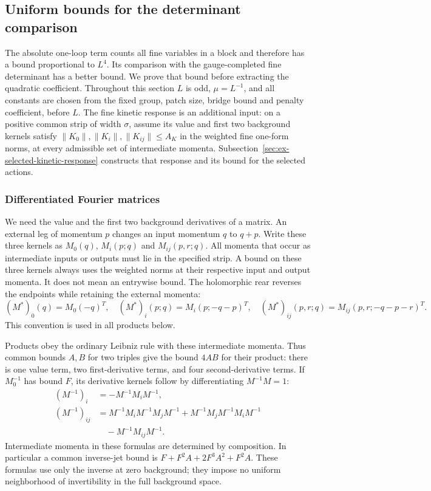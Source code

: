 \subsection{Uniform bounds for the determinant comparison}
\label{sec:ex-stationary-determinant-prices}

The absolute one-loop term counts all fine variables in a block and
therefore has a bound proportional to $L^4$. Its comparison with the
gauge-completed fine determinant has a better bound. We prove that
bound before extracting the quadratic coefficient. Throughout this
section $L$ is odd, $\mu=L^{-1}$, and all constants are chosen from
the fixed group, patch size, bridge bound and penalty coefficient,
before $L$. The fine kinetic response is an additional input: on a positive
common strip of width $\sigma$, assume its value and first two
background kernels satisfy $\|K_0\|,\|K_i\|,\|K_{ij}\|\leq A_K$
in the weighted fine one-form norms, at every admissible set of
intermediate momenta. Subsection~\ref{sec:ex-selected-kinetic-response}
constructs that response and its bound for the selected actions.

\subsubsection{Differentiated Fourier matrices}
We need the value and the first two background derivatives of a matrix.
An external leg of momentum $p$ changes an input momentum $q$ to $q+p$.
Write these three kernels as $M_0(q)$, $M_i(p;q)$ and
$M_{ij}(p,r;q)$. All momenta that occur as intermediate inputs or
outputs must lie in the specified strip. A bound on these three
kernels always uses the weighted norms at their respective input and
output momenta. It does not mean an entrywise bound. The holomorphic rear reverses
the endpoints while retaining the external momenta:
\[
 (M^*)_0(q)=M_0(-q)^T,\quad
 (M^*)_i(p;q)=M_i(p;-q-p)^T,\quad
 (M^*)_{ij}(p,r;q)=M_{ij}(p,r;-q-p-r)^T.
\]
This convention is used in all products below.

Products obey the ordinary Leibniz rule with these intermediate momenta.
Thus common bounds $A,B$ for two triples give the bound $4AB$ for
their product: there is one value term, two first-derivative terms,
and four second-derivative terms. If $M_0^{-1}$ has bound $F$, its
derivative kernels follow by differentiating $M^{-1}M=1$:
\begin{align*}
 (M^{-1})_i&=-M^{-1}M_iM^{-1},\\
 (M^{-1})_{ij}&=M^{-1}M_iM^{-1}M_jM^{-1}
 +M^{-1}M_jM^{-1}M_iM^{-1}\\
 &\quad-M^{-1}M_{ij}M^{-1}.
\end{align*}
Intermediate momenta in these formulas are determined by composition.
In particular a common inverse-jet bound is
$F+F^2A+2F^3A^2+F^2A$. These formulas use only the inverse at zero
background; they impose no uniform neighborhood of invertibility in
the full background space.

